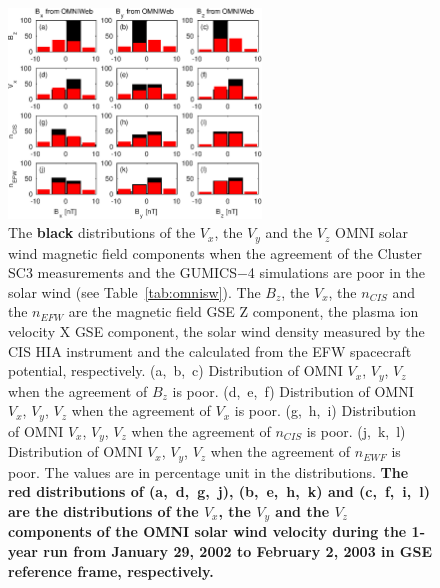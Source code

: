 \documentclass[linenumbers,draft]{agujournal}
\begin{document}
\begin{figure}[h]
\centering
\includegraphics[width=0.6\textwidth,angle=0]{swe-2021-corr-f14}
\caption{The \textbf{black} distributions of the $V_{x}$, the $V_{y}$  and the $V_{z}$ OMNI solar wind magnetic field components when the agreement of the Cluster SC3 measurements and the GUMICS$-$4 simulations are poor in the solar wind (see Table~\ref{tab:omnisw}). The $B_{z}$, the $V_{x}$, the $n_{CIS}$ and the $n_{EFW}$ are the magnetic field GSE Z component, the plasma ion velocity X GSE component, the  solar wind density measured by the CIS HIA instrument and the calculated from the EFW spacecraft potential, respectively. (a,~b,~c) Distribution of OMNI $V_{x}$, $V_{y}$, $V_{z}$ when the agreement of $B_{z}$ is poor. (d,~e,~f) Distribution of OMNI  $V_{x}$, $V_{y}$, $V_{z}$ when the agreement of $V_{x}$ is poor. (g,~h,~i) Distribution of OMNI $V_{x}$, $V_{y}$, $V_{z}$ when the agreement of $n_{CIS}$ is poor. (j,~k,~l) Distribution of OMNI $V_{x}$, $V_{y}$, $V_{z}$ when the agreement of $n_{EWF}$ is poor. The values are in percentage unit in the distributions. \textbf{The red distributions of (a,~d,~g,~j), (b,~e,~h,~k) and (c,~f,~i,~l) are the distributions of the $V_{x}$, the $V_{y}$ and the $V_{z}$ components of the OMNI solar wind velocity during the 1-year run from January 29, 2002 to February 2, 2003 in GSE reference frame, respectively.}}
\label{fig:swomnivxyz}
\end{figure}

\pagebreak
\end{document}
